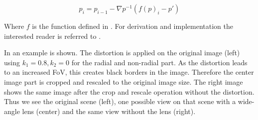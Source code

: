 \begin{equation}
	p_i = p_{i-1} - \nabla p^{-1} (f(p)_i-p')
\end{equation}

Where $f$ is the function defined in . For derivation and implementation the interested reader is referred to \cite{Vass}.

In  an example is shown. The distortion is applied on the original image (left) using $k_1=0.8, k_2=0$ for the radial and non-radial part. As the distortion leads to an increased \ac{FoV}, this creates black borders in the image. Therefore the center image part is cropped and rescaled to the original image size. The right image shows the same image after the crop and rescale operation without the distortion. Thus we see the original scene (left), one possible view on that scene with a wide-angle lens (center) and the same view without the lens (right). 

